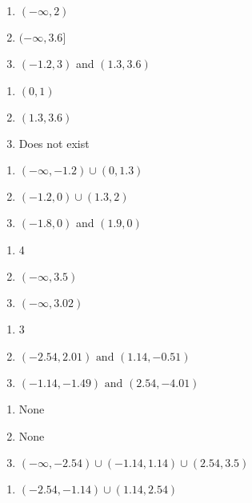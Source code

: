 \begin{multicols}{3}
\begin{enumerate}	\setcounter{enumi}{\value{Review}} 
    \item $(-\infty, 2)$
	\item $(-\infty, 3.6]$
	\item $(-1.2,3)$ and $(1.3,3.6)$
\end{enumerate}	\setcounter{Review}{\value{enumi}}
\end{multicols}
\begin{multicols}{3}
\begin{enumerate}	\setcounter{enumi}{\value{Review}} 
	\item $(0,1)$
	\item $(1.3,3.6)$
	\item Does not exist
\end{enumerate}	\setcounter{Review}{\value{enumi}}
\end{multicols}
\begin{multicols}{3}
\begin{enumerate}	\setcounter{enumi}{\value{Review}} 
	\item $(-\infty, -1.2) \cup (0,1.3)$
	\item $(-1.2, 0) \cup (1.3,2)$
	\item $(-1.8,0)$ and $(1.9,0)$
\end{enumerate}	\setcounter{Review}{\value{enumi}}
\end{multicols}
\begin{multicols}{3}
\begin{enumerate}	\setcounter{enumi}{\value{Review}} 
	\item 4
	\item $(-\infty, 3.5)$
    \item $(-\infty, 3.02)$
\end{enumerate}	\setcounter{Review}{\value{enumi}}
\end{multicols}
\begin{multicols}{3}
\begin{enumerate}	\setcounter{enumi}{\value{Review}} 
	\item 3
    \item $(-2.54,2.01) \text{ and } (1.14,-0.51)$
    \item $(-1.14,-1.49) \text{ and } (2.54,-4.01)$
\end{enumerate}	\setcounter{Review}{\value{enumi}}
\end{multicols}
\begin{multicols}{3}
\begin{enumerate}	\setcounter{enumi}{\value{Review}} 
	\item None
    \item None
    \item $(-\infty, -2.54) \cup (-1.14,1.14) \cup (2.54,3.5)$
\end{enumerate}	\setcounter{Review}{\value{enumi}}
\end{multicols}
\begin{multicols}{3}
\begin{enumerate}	\setcounter{enumi}{\value{Review}} 
	\item $(-2.54,-1.14) \cup (1.14,2.54)$
\end{enumerate}	\setcounter{Review}{\value{enumi}}
\end{multicols}
